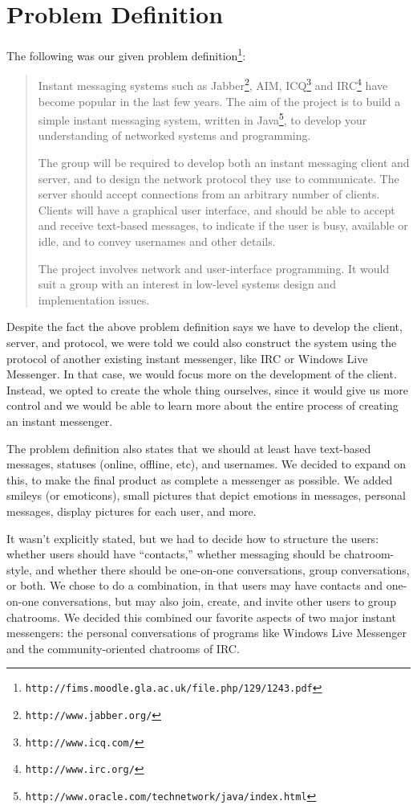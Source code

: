 
\section{Problem Definition}
The following was our given problem definition\footnote{\texttt{http://fims.moodle.gla.ac.uk/file.php/129/1243.pdf}}:

\begin{quote}
Instant messaging systems such as Jabber\footnote{\texttt{http://www.jabber.org/}}, AIM, ICQ\footnote{\texttt{http://www.icq.com/}} and IRC\footnote{\texttt{http://www.irc.org/}} have become popular in the last few years. The aim of the project is to build a simple instant messaging system, written in Java\footnote{\texttt{http://www.oracle.com/technetwork/java/index.html}}, to develop your understanding of networked systems and programming.

The group will be required to develop both an instant messaging client and server, and to design the network protocol they use to communicate. The server should accept connections from an arbitrary number of clients. Clients will have a graphical user interface, and should be able to accept and receive text-based messages, to indicate if the user is busy, available or idle, and to convey usernames and other details.

The project involves network and user-interface programming. It would suit a group with an interest in low-level systems design and implementation issues.
\end{quote}

Despite the fact the above problem definition says we have to develop the client, server, and protocol, we were told we could also construct the system using the protocol of another existing instant messenger, like IRC or Windows Live Messenger. In that case, we would focus more on the development of the client. Instead, we opted to create the whole thing ourselves, since it would give us more control and we would be able to learn more about the entire process of creating an instant messenger.

The problem definition also states that we should at least have text-based messages, statuses (online, offline, etc), and usernames. We decided to expand on this, to make the final product as complete a messenger as possible. We added smileys (or emoticons), small pictures that depict emotions in messages, personal messages, display pictures for each user, and more.

It wasn't explicitly stated, but we had to decide how to structure the users: whether users should have ``contacts,'' whether messaging should be chatroom-style, and whether there should be one-on-one conversations, group conversations, or both. We chose to do a combination, in that users may have contacts and one-on-one conversations, but may also join, create, and invite other users to group chatrooms. We decided this combined our favorite aspects of two major instant messengers: the personal conversations of programs like Windows Live Messenger and the community-oriented chatrooms of IRC.

